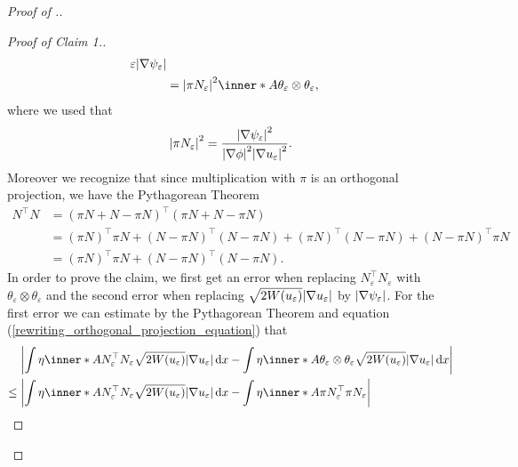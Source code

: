 \begin{proof}[Proof of .]
\begin{proof}[Proof of Claim 1.]
\begin{align}
{{{							\varepsilon } }{ 
					\abs{ \nabla \psi_{ \varepsilon } } } }
			\\
			\label{rewriting_orthogonal_projection_equation}
			& = 
			\abs{ \pi N_{ \varepsilon } }^{ 2 }
			\inner*{ A }{ \theta_{ \varepsilon } \otimes \theta_{ \varepsilon } 
			},
		\end{align}
		where we used that 
		\begin{equation*}
			\abs{ \pi N_{ \varepsilon } }^{ 2 }
			=
			\frac{ \abs{ \nabla \psi_{ \varepsilon } }^{ 2 } }{ \abs{ \nabla 
					\phi }^{ 2 } \abs{ \nabla u_{ \varepsilon } }^{ 2 } }.
		\end{equation*}
		Moreover we recognize that since multiplication with $ \pi $ is 
		an orthogonal projection, we have the Pythagorean Theorem
		\begin{align*}
			N^{ \top } N 
			& =
			( \pi N + N - \pi N )^{ \top } ( \pi N + N - \pi N )
			\\
			& =
			( \pi N )^{ \top } \pi N 
			+
			( N - \pi N )^{ \top } ( N - \pi N )
			+
			( \pi N )^{ \top } ( N - \pi N )
			+
			( N - \pi N )^{ \top } \pi N 
			\\
			& =
			( \pi N )^{ \top } \pi N
			+
			( N - \pi N )^{ \top } ( N - \pi N ).
		\end{align*}
		In order to prove the claim, we first get an error when replacing $ N_{ 
			\varepsilon }^{ \top } N_{ \varepsilon } $ with 
		$ \theta_{ \varepsilon 
			} 
		\otimes \theta_{ \varepsilon } $ 
		and the second error when replacing 
		$ \sqrt{ 2 W ( u_{ \varepsilon } ) } \abs{ \nabla u_{ \varepsilon } } $ 
		by $ \abs{ \nabla \psi_{ \varepsilon } } $.
		For the first error we can estimate by the Pythagorean Theorem and 
		equation (\ref{rewriting_orthogonal_projection_equation}) that
		\begin{align*}
			& \abs{ 
				\int
				\eta 
				\inner*{ A }{ N_{ \varepsilon }^{ \top } N_{ \varepsilon } }
				\sqrt{ 2 W ( u_{ \varepsilon } ) } \abs{ \nabla u_{ 
						\varepsilon } }
				\dd{ x }
				-
				\int
				\eta
				\inner*{ A }{ \theta_{ \varepsilon } \otimes \theta_{ 
				\varepsilon 
				} }
				\sqrt{ 2 W ( u_{ \varepsilon } ) } \abs{ \nabla u_{ 
						\varepsilon } }
				\dd{ x }
			}
			\\
			\leq{} &
			\abs{ 
				\int
				\eta 
				\inner*{ A }{ N_{ \varepsilon }^{ \top } N_{ \varepsilon } }
				\sqrt{ 2 W ( u_{ \varepsilon } ) } \abs{ \nabla u_{ 
						\varepsilon } } 
				\dd{ x }
				-
				\int 
				\eta
				\inner*{ A }
				{ \pi N_{ \varepsilon }^{ \top } \pi N_{ \varepsilon } }
}
\end{align*}
\end{proof}
\end{proof}
